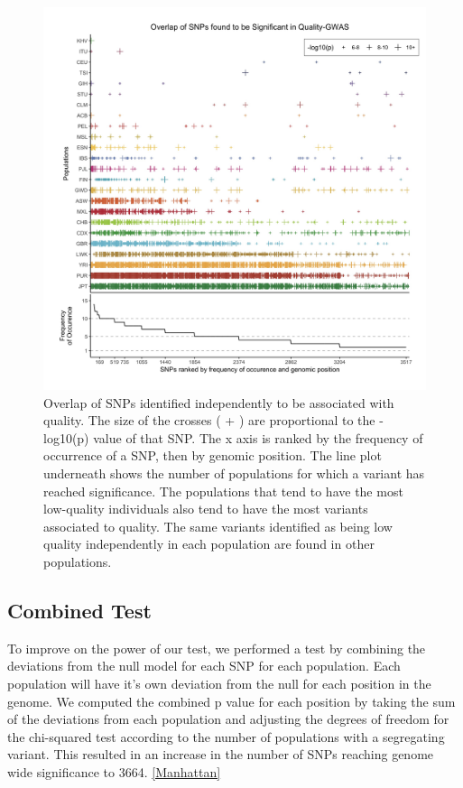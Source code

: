 \documentclass[9pt,lineno]{elife}
\begin{document}
\begin{figure}
\includegraphics[width=\hsize,keepaspectratio]{SNPOverlap6.jpg}

\caption{Overlap of SNPs identified independently to be associated with quality. 
The size of the crosses ( + ) are proportional to the -log10(p) value of that SNP.
The x axis is ranked by the frequency of occurrence of a SNP, then by genomic position.
The line plot underneath shows the number of populations for which a variant has reached significance.
The populations that tend to have the most low-quality individuals also tend to have the most variants associated to quality. 
The same variants identified as being low quality independently in each population are found in other populations. }
  \label{OverLap}
\end{figure}

\subsection{Combined Test}
To improve on the power of our test, we performed a test by combining the deviations from the null model for each SNP for each population.
Each population will have it's own deviation from the null for each position in the genome.
We computed the combined p value for each position by taking the sum of the deviations from each population and adjusting the degrees of freedom for the chi-squared test according to the number of populations with a segregating variant.
This resulted in an increase in the number of SNPs reaching genome wide significance to 3664. \ref{Manhattan}
\end{document}
